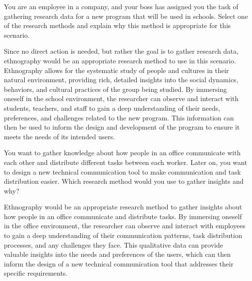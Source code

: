 \begin{ejercicio}
    You are an employee in a company, and your boss has assigned you the task of gathering research data for a new program that will be used in schools. Select one of the research methods and explain why this method is appropriate for this scenario.

    Since no direct action is needed, but rather the goal is to gather research data, ethnography would be an appropriate research method to use in this scenario. Ethnography allows for the systematic study of people and cultures in their natural environment, providing rich, detailed insights into the social dynamics, behaviors, and cultural practices of the group being studied. By immersing oneself in the school environment, the researcher can observe and interact with students, teachers, and staff to gain a deep understanding of their needs, preferences, and challenges related to the new program. This information can then be used to inform the design and development of the program to ensure it meets the needs of its intended users.
\end{ejercicio}

\begin{ejercicio}
    You want to gather knowledge about how people in an office communicate with each other and distribute different tasks between each worker. Later on, you want to design a new technical communication tool to make communication and task distribution easier. Which research method would you use to gather insights and why?

    Ethnography would be an appropriate research method to gather insights about how people in an office communicate and distribute tasks. By immersing oneself in the office environment, the researcher can observe and interact with employees to gain a deep understanding of their communication patterns, task distribution processes, and any challenges they face. This qualitative data can provide valuable insights into the needs and preferences of the users, which can then inform the design of a new technical communication tool that addresses their specific requirements.
\end{ejercicio}

